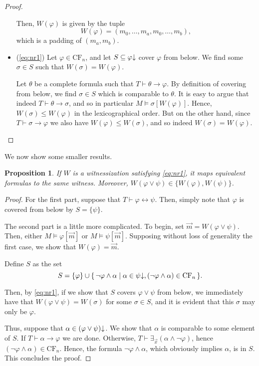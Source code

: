 \documentclass{article}
\newtheorem{prop}[theorem]{Proposition}
\theoremstyle{nonumberplain}
\newtheorem{proof}{Proof}
\newcommand{\CF}{\mathrm{CF}}
\newcommand{\dncl}[1]{{#1}\hspace{-0.25em}\downarrow}
\begin{document}
\begin{proof}
\begin{itemize}
Then, $W(\varphi)$ is given by the tuple
\begin{equation}
W(\varphi) = (m_0, \dots, m_a, m_0, \dots, m_b),
\end{equation}
which is a padding of $(m_a,m_b)$.

\item (\ref{eq:nr1}) Let $\varphi \in \CF_n$, and let $S \subseteq \dncl\varphi$ cover $\varphi$ from below. We find some $\sigma \in S$ such that $W(\sigma) = W(\varphi)$.

Let $\theta$ be a complete formula such that $T \vdash \theta \rightarrow \varphi$. By definition of covering from below, we find $\sigma \in S$ which is comparable to $\theta$. It is easy to argue that indeed $T \vdash \theta \rightarrow \sigma$, and so in particular $M \vDash \sigma[W(\varphi)]$. Hence, $W(\sigma) \leq W(\varphi)$ in the lexicographical order. But on the other hand, since $T \vdash \sigma \rightarrow \varphi$ we also have $W(\varphi) \leq W(\sigma)$, and so indeed $W(\sigma) = W(\varphi)$.
\end{itemize}
\end{proof}

We now show some smaller results.

\begin{prop}
If $W$ is a witnessization satisfying \eqref{eq:nr1}, it maps equivalent formulas to the same witness. Moreover, $W(\varphi \lor \psi) \in \{W(\varphi), W(\psi)\}$.
\end{prop}

\begin{proof}
For the first part, suppose that $T \vdash \varphi \leftrightarrow \psi$. Then, simply note that $\varphi$ is covered from below by $S = \{\psi\}$.

The second part is a little more complicated. To begin, set $\vec m = W(\varphi \lor \psi)$. Then, either $M \vDash \varphi[\vec m]$ or $M \vDash \psi[\vec m]$. Supposing without loss of generality the first case, we show that $W(\varphi) = \vec m$.

Define $S$ as the set
\begin{equation}
S = \{\varphi\} \cup \{\, \neg\varphi \land \alpha \mid \alpha \in \dncl\psi, (\neg\varphi \land \alpha) \in \CF_n\,\}.
\end{equation}

Then, by \eqref{eq:nr1}, if we show that $S$ covers $\varphi \lor \psi$ from below, we immediately have that $W(\varphi \lor \psi) = W(\sigma)$ for some $\sigma \in S$, and it is evident that this $\sigma$ may only be $\varphi$.

Thus, suppose that $\alpha \in \dncl{(\varphi \lor \psi)}$. We show that $\alpha$ is comparable to some element of $S$. If $T \vdash \alpha \rightarrow \varphi$ we are done. Otherwise, $T \vdash \exists_{\vec x}(\alpha \land \neg\varphi)$, hence $(\neg\varphi \land\alpha) \in \CF_n$. Hence, the formula $\neg\varphi \land\alpha$, which obviously implies $\alpha$, is in $S$. This concludes the proof.
\end{proof}
\end{document}
